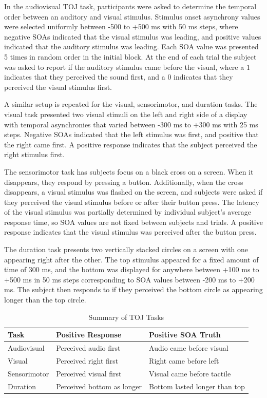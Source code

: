\documentclass[11pt, oneside, openany]{scrbook}
\begin{document}
In the audiovisual TOJ task, participants were asked to determine the temporal order between an auditory and visual stimulus. Stimulus onset asynchrony values were selected uniformly between -500 to +500 ms with 50 ms steps, where negative SOAs indicated that the visual stimulus was leading, and positive values indicated that the auditory stimulus was leading. Each SOA value was presented 5 times in random order in the initial block. At the end of each trial the subject was asked to report if the auditory stimulus came before the visual, where a \(1\) indicates that they perceived the sound first, and a \(0\) indicates that they perceived the visual stimulus first.

A similar setup is repeated for the visual, sensorimotor, and duration tasks. The visual task presented two visual stimuli on the left and right side of a display with temporal asynchronies that varied between -300 ms to +300 ms with 25 ms steps. Negative SOAs indicated that the left stimulus was first, and positive that the right came first. A positive response indicates that the subject perceived the right stimulus first.

The sensorimotor task has subjects focus on a black cross on a screen. When it disappears, they respond by pressing a button. Additionally, when the cross disappears, a visual stimulus was flashed on the screen, and subjects were asked if they perceived the visual stimulus before or after their button press. The latency of the visual stimulus was partially determined by individual subject's average response time, so SOA values are not fixed between subjects and trials. A positive response indicates that the visual stimulus was perceived after the button press.

The duration task presents two vertically stacked circles on a screen with one appearing right after the other. The top stimulus appeared for a fixed amount of time of 300 ms, and the bottom was displayed for anywhere between +100 ms to +500 ms in 50 ms steps corresponding to SOA values between -200 ms to +200 ms. The subject then responds to if they perceived the bottom circle as appearing longer than the top circle.

\begin{table}[!h]
\centering
\caption{\label{tab:ch020-toj-summary}Summary of TOJ Tasks}
\centering
\begin{tabular}[t]{lll}
\toprule
Task & Positive Response & Positive SOA Truth\\
\midrule
Audiovisual & Perceived audio first & Audio came before visual\\
Visual & Perceived right first & Right came before left\\
Sensorimotor & Perceived visual first & Visual came before tactile\\
Duration & Perceived bottom as longer & Bottom lasted longer than top\\
\bottomrule
\end{tabular}
\end{table}
\end{document}
